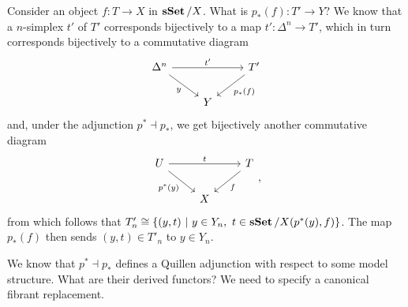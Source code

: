 \documentclass[a4paper,12pt]{scrartcl}
\begin{document}
Consider an object $f\colon T\rightarrow X$ in $\operatorname{\mathbf{sSet}}/X$. What is $p_*(f)\colon
T'\rightarrow Y$? We know that a $n$-simplex $t'$ of $T'$ corresponds
bijectively to a map $t'\colon\Delta^n\rightarrow T'$, which in turn corresponds
bijectively to a commutative diagram
\[\begin{tikzcd}
	{\Delta^n} & {} & {T'} \\
	& Y
	\arrow["{t'}", from=1-1, to=1-3]
	\arrow["y"', from=1-1, to=2-2]
	\arrow["{p_*(f)}", from=1-3, to=2-2]
\end{tikzcd}\]
and, under the adjunction $p^*\dashv p_*$, we get bijectively another
commutative diagram
\[\begin{tikzcd}
	U & {} & T \\
	& X
	\arrow["t", from=1-1, to=1-3]
	\arrow["{p^*(y)}"', from=1-1, to=2-2]
	\arrow["f", from=1-3, to=2-2]
\end{tikzcd},\]
from which follows that $T'_n\cong\{(y,t)\ |\ y\in Y_n,\
t\in\operatorname{\mathbf{sSet}}/X(p^*(y),f)\}$. The map $p_*(f)$ then sends $(y,t)\in T'_n$ to $y\in
Y_n$.

We know that $p^*\dashv p_*$ defines a Quillen adjunction with respect to some
model structure. What are their derived functors? We need to specify a canonical
fibrant replacement.

\printbibliography
\end{document}
